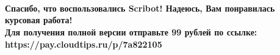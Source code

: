 ~\\
~\\
~\\
\begin{center}
    \topskip=0pt
    \vspace*{\fill}
    \textbf{
Спасибо, что воспользовались Scribot! Надеюсь, Вам понравилась курсовая работа!\\
Для получения полной версии отправьте 99 рублей по ссылке:\\
https://pay.cloudtips.ru/p/7a822105\\
}
\end{center}
\newpage